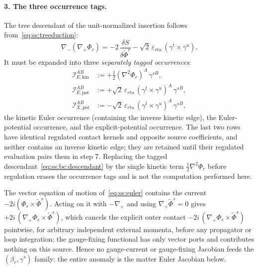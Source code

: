 \paragraph{3. The three occurrence tags.}
The tree descendant of the unit-normalized insertion follows
from~\eqref{eq:ss:treeduction}:
\begin{equation}\label{eq:ss:bc:descendant}
\nabla_{-}(\nabla_{+}\Phi_{r})
=-2\,\frac{\delta S}{\delta\widetilde\Phi^{r}}
-\sqrt2\,\varepsilon_{rtu}\,(\gamma^{t}\times\gamma^{u}) .
\end{equation}
It must be expanded into three \emph{separately tagged occurrences}:
\begin{align}
\mathcal I_{E,\mathrm{kin}}^{AB}
&:=+\frac12(\nabla^{2}\Phi_{r})^{A}\,\gamma^{sB} ,
\label{eq:ss:bc:kin}\\
\mathcal I_{E,\mathrm{pot}}^{AB}
&:=+\sqrt2\,\varepsilon_{rtu}\,(\gamma^{t}\times\gamma^{u})^{A}\,\gamma^{sB} ,
\label{eq:ss:bc:epot}\\
\mathcal I_{X,\mathrm{pot}}^{AB}
&:=-\sqrt2\,\varepsilon_{rtu}\,(\gamma^{t}\times\gamma^{u})^{A}\,\gamma^{sB} ,
\label{eq:ss:bc:xpot}
\end{align}
the kinetic Euler occurrence (containing the inverse kinetic edge), the
Euler-potential occurrence, and the explicit-potential occurrence. The last
two rows have identical regulated contact kernels and opposite source
coefficients, and neither contains an inverse kinetic edge; they are retained
until their regulated evaluation pairs them in step 7. Replacing the tagged
descendant~\eqref{eq:ss:bc:descendant} by the single kinetic term
$\tfrac12\nabla^{2}\Phi_{r}$ before regulation erases the occurrence tags and
is not the computation performed here.

\begin{remark}%
\label{rem:ss:bc:gaugecurrent}
The vector equation of motion of~\eqref{eq:ss:euler} contains the current
$-2i(\Phi_{s}\times\widetilde\Phi^{s})$. Acting on it with $-\nabla_{+}$ and
using $\nabla_{+}\widetilde\Phi^{s}=0$ gives
$+2i\,(\nabla_{+}\Phi_{s}\times\widetilde\Phi^{s})$, which cancels the
explicit outer contact $-2i\,(\nabla_{+}\Phi_{s}\times\widetilde\Phi^{s})$
pointwise, for arbitrary independent external momenta, before any propagator
or loop integration; the gauge-fixing functional has only vector ports and
contributes nothing on this source. Hence no gauge-current or gauge-fixing
Jacobian feeds the $(\beta_r,\gamma^s)$ family: the entire anomaly is the
matter Euler Jacobian below.
\end{remark}

